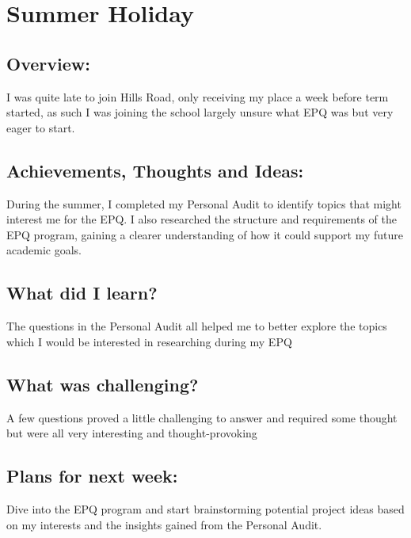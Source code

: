 \section{Summer Holiday}

\subsection*{Overview:}
I was quite late to join Hills Road, only receiving my place a week before term started, as such I was joining the school largely unsure what EPQ was but very eager to start.
\subsection*{Achievements, Thoughts and Ideas:}
During the summer, I completed my Personal Audit to identify topics that might interest me for the EPQ. I also researched the structure and requirements of the EPQ program, gaining a clearer understanding of how it could support my future academic goals.

\subsection*{What did I learn?}
The questions in the Personal Audit all helped me to better explore the topics which I would be interested in researching during my EPQ

\subsection*{What was challenging?}
A few questions proved a little challenging to answer and required some thought but were all very interesting and thought-provoking

\subsection*{Plans for next week:}
Dive into the EPQ program and start brainstorming potential project ideas based on my interests and the insights gained from the Personal Audit.
